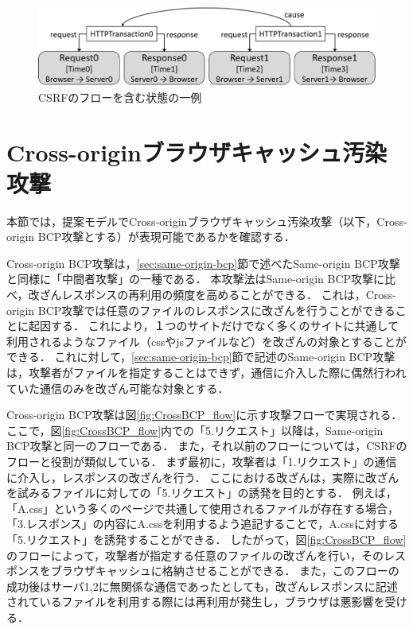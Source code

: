 \documentclass[12pt,a4paper]{jbook}
\begin{document}
\begin{figure}[htb]
\centering
\includegraphics[width=450pt]{./fig/CSRF_alloy.eps}
\caption{CSRFのフローを含む状態の一例}
\label{fig:CSRF_alloy}
\end{figure}

\section{Cross-originブラウザキャッシュ汚染攻撃}
本節では，提案モデルでCross-originブラウザキャッシュ汚染攻撃\cite{bcpattack}（以下，Cross-origin BCP攻撃とする）が表現可能であるかを確認する．

Cross-origin BCP攻撃は，\ref{sec:same-origin-bcp}節で述べたSame-origin BCP攻撃と同様に「中間者攻撃」の一種である．
本攻撃法はSame-origin BCP攻撃に比べ，改ざんレスポンスの再利用の頻度を高めることができる．
これは，Cross-origin BCP攻撃では任意のファイルのレスポンスに改ざんを行うことができることに起因する．
これにより，１つのサイトだけでなく多くのサイトに共通して利用されるようなファイル（cssやjsファイルなど）を改ざんの対象とすることができる．
これに対して，\ref{sec:same-origin-bcp}節で記述のSame-origin BCP攻撃は，攻撃者がファイルを指定することはできず，通信に介入した際に偶然行われていた通信のみを改ざん可能な対象とする．

Cross-origin BCP攻撃は図\ref{fig:CrossBCP_flow}に示す攻撃フローで実現される．
ここで，図\ref{fig:CrossBCP_flow}内での「5.リクエスト」以降は，Same-origin BCP攻撃と同一のフローである．
また，それ以前のフローについては，CSRFのフローと役割が類似している．
まず最初に，攻撃者は「1.リクエスト」の通信に介入し，レスポンスの改ざんを行う．
ここにおける改ざんは，実際に改ざんを試みるファイルに対しての「5.リクエスト」の誘発を目的とする．
例えば，「A.css」という多くのページで共通して使用されるファイルが存在する場合，「3.レスポンス」の内容にA.cssを利用するよう追記することで，A.cssに対する「5.リクエスト」を誘発することができる．
したがって，図\ref{fig:CrossBCP_flow}のフローによって，攻撃者が指定する任意のファイルの改ざんを行い，そのレスポンスをブラウザキャッシュに格納させることができる．
また，このフローの成功後はサーバ1,2に無関係な通信であったとしても，改ざんレスポンスに記述されているファイルを利用する際には再利用が発生し，ブラウザは悪影響を受ける．
\end{document}
